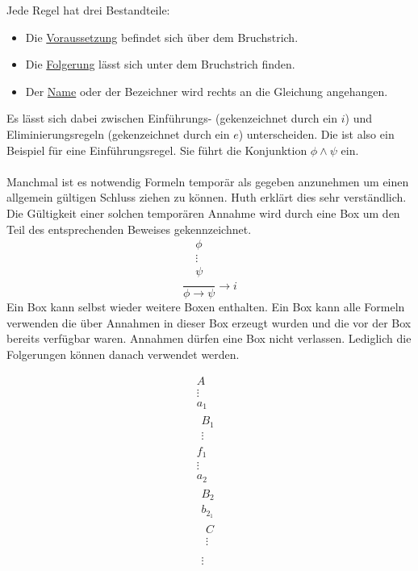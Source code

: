 Jede Regel hat drei Bestandteile:
\begin{itemize}
	\item Die \underline{Voraussetzung} befindet sich über dem Bruchstrich.
	\item Die \underline{Folgerung} lässt sich unter dem Bruchstrich finden.
	\item Der \underline{Name} oder der Bezeichner wird rechts an die Gleichung angehangen.
\end{itemize}
Es lässt sich dabei zwischen Einführungs- (gekenzeichnet durch ein $i$) und Eliminierungsregeln (gekenzeichnet durch ein $e$) unterscheiden.
Die  ist also ein Beispiel für eine Einführungsregel.
Sie führt die Konjunktion $\phi \wedge \psi$ ein.\\
\\
Manchmal ist es notwendig Formeln temporär als gegeben anzunehmen um einen allgemein gültigen Schluss ziehen zu können. Huth \cite[S.11]{huth2004logic} erklärt dies sehr verständlich.\\
Die Gültigkeit einer solchen temporären Annahme wird durch eine Box um den Teil des entsprechenden Beweises gekennzeichnet.\\
\begin{equation}
	\label{eq:iImplication}
	\frac{
		\boxed{
			\begin{array}{c}
					\phi\\
					\vdots\\
					\psi\\
			\end{array}
		}
	}
	{\phi \rightarrow \psi} \rightarrow i
\end{equation}
Ein Box kann selbst wieder weitere Boxen enthalten.
Ein Box kann alle Formeln verwenden die über Annahmen in dieser Box erzeugt wurden und die vor der Box bereits verfügbar waren.
Annahmen dürfen eine Box nicht verlassen. Lediglich die Folgerungen können danach verwendet werden.

\begin{equation}
	\boxed{\begin{array}{c}
		A\\
		\vdots\\
		a_1\\
		\boxed{\begin{array}{c}
		B_1\\
		\vdots
		\end{array}}\\
		f_1\\
		\vdots\\
		a_2\\
		\boxed{\begin{array}{c}
		B_2\\
		b_{2_1}\\
		\boxed{\begin{array}{c}
		C\\
		\vdots\\
		\end{array}}\\
		\vdots\\
		\end{array}}
	\end{array}}
\end{equation}

